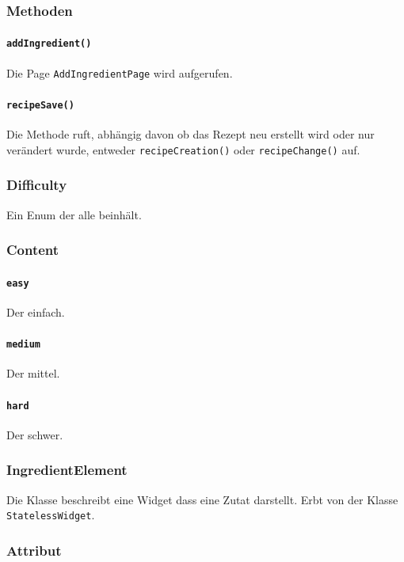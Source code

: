 \documentclass{entwurfsheft}
\begin{document}
        \subsubsection*{Methoden}
            \paragraph*{\texttt{addIngredient()}} Die Page \texttt{AddIngredientPage} wird aufgerufen.
            \paragraph*{\texttt{recipeSave()}} Die Methode ruft, abhängig davon ob das Rezept neu erstellt wird oder nur verändert wurde, entweder \texttt{recipeCreation()} oder \texttt{recipeChange()} auf.
        
    \subsubsection{Difficulty}
            Ein Enum der alle  beinhält.
            \subsubsection*{Content}
                \paragraph*{\texttt{easy}} Der  einfach.
                \paragraph*{\texttt{medium}} Der  mittel.
                \paragraph*{\texttt{hard}} Der  schwer.

    \subsubsection*{IngredientElement}
            Die Klasse beschreibt eine Widget dass eine Zutat darstellt. Erbt von der Klasse \texttt{StatelessWidget}.
            \subsubsection*{Attribut}
\end{document}
